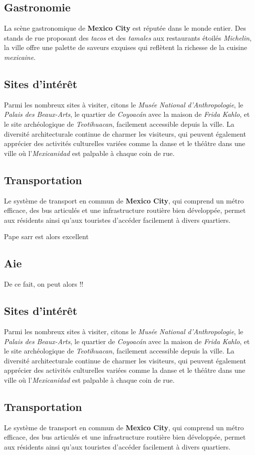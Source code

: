 \documentclass[12pt, a4paper]{article}
\begin{document}
\subsection*{\textbf{Gastronomie}}

La scène gastronomique de \textbf{Mexico City} est réputée dans le monde entier. Des stands de rue proposant des \textit{tacos} et des \textit{tamales} aux restaurants étoilés \textit{Michelin}, la ville offre une palette de saveurs exquises qui reflètent la richesse de la cuisine \textit{mexicaine}.

\subsection*{\textbf{Sites d'intérêt}}

Parmi les nombreux sites à visiter, citons le \textit{Musée National d'Anthropologie}, le \textit{Palais des Beaux-Arts}, le quartier de \textit{Coyoacán} avec la maison de \textit{Frida Kahlo}, et le site archéologique de \textit{Teotihuacan}, facilement accessible depuis la ville.
La diversité architecturale continue de charmer les visiteurs, qui peuvent également apprécier des activités culturelles variées comme la danse et le théâtre dans une ville où l'\textit{Mexicanidad} est palpable à chaque coin de rue. \subsection*{\textbf{Transportation}} Le système de transport en commun de \textbf{Mexico City}, qui comprend un métro efficace, des bus articulés et une infrastructure routière bien développée, permet aux résidents ainsi qu'aux touristes d'accéder facilement à divers quartiers.

Pape sarr est alors excellent
\subsection{Aie}


De ce fait, on peut alors !!

\subsection*{\textbf{Sites d'intérêt}}

Parmi les nombreux sites à visiter, citons le \textit{Musée National d'Anthropologie}, le \textit{Palais des Beaux-Arts}, le quartier de \textit{Coyoacán} avec la maison de \textit{Frida Kahlo}, et le site archéologique de \textit{Teotihuacan}, facilement accessible depuis la ville.
La diversité architecturale continue de charmer les visiteurs, qui peuvent également apprécier des activités culturelles variées comme la danse et le théâtre dans une ville où l'\textit{Mexicanidad} est palpable à chaque coin de rue. \subsection*{\textbf{Transportation}} Le système de transport en commun de \textbf{Mexico City}, qui comprend un métro efficace, des bus articulés et une infrastructure routière bien développée, permet aux résidents ainsi qu'aux touristes d'accéder facilement à divers quartiers.
\end{document}

